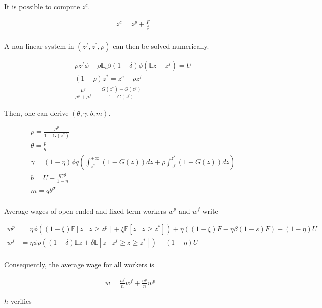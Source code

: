 It is possible to compute $z^c$.

\begin{align*}
&z^c = z^p + \frac{F}{\phi}\\
\end{align*} 

A non-linear system in $\left(z^f, z^*, \rho\right)$ can then be solved numerically.

\begin{align*}
&\rho z^f \phi + \rho \mathbb{E}_t \beta (1-\delta) \phi \left( \mathbb{E}z - z^f \right) = U \\
&(1-\rho) z^* = z^c - \rho z^f\\
&\frac{\mu^f}{\mu^p + \mu^f} = \frac{ G \left( z^*\right) - G \left( z^f\right) }{ 1 - G \left( z^f\right) }
\end{align*}

Then, one can derive $\left(\theta, \gamma, b, m \right)$.

\begin{align*}
&p = \frac{\mu^p}{1-G\left( z^*\right)}\\
&\theta = \frac{p}{q}\\
&\gamma = (1-\eta) \phi q \left( \int_{z^*}^{+\infty} \left( 1 - G(z) \right) dz + \rho \int_{z^f}^{z^*} \left( 1 - G(z) \right) dz \right)\\
&b = U - \frac{\eta \gamma \theta}{1-\eta} \\
&m = q \theta^{\sigma}\\
\end{align*}

Average wages of open-ended and fixed-term workers $w^p$ and $w^f$ write

\begin{align*}
w^p &= \eta \phi \left( (1-\xi) \mathbb{E} \left[ z \mid z \geq z^p \right] + \xi \mathbb{E} \left[ z \mid z \geq z^* \right]\right) + \eta \left( (1-\xi) F - \eta \beta (1-s) F \right) + (1-\eta) U\\
w^f &= \eta \phi \rho \left( (1-\delta) \mathbb{E} z + \delta \mathbb{E} \left[ z \mid z^f \geq z \geq z^* \right] \right) + (1-\eta) U\\
\end{align*}

Consequently, the average wage for all workers is

\begin{align*}
w = \frac{n^f}{n} w^f + \frac{n^p}{n} w^p
\end{align*}

$h$ verifies

